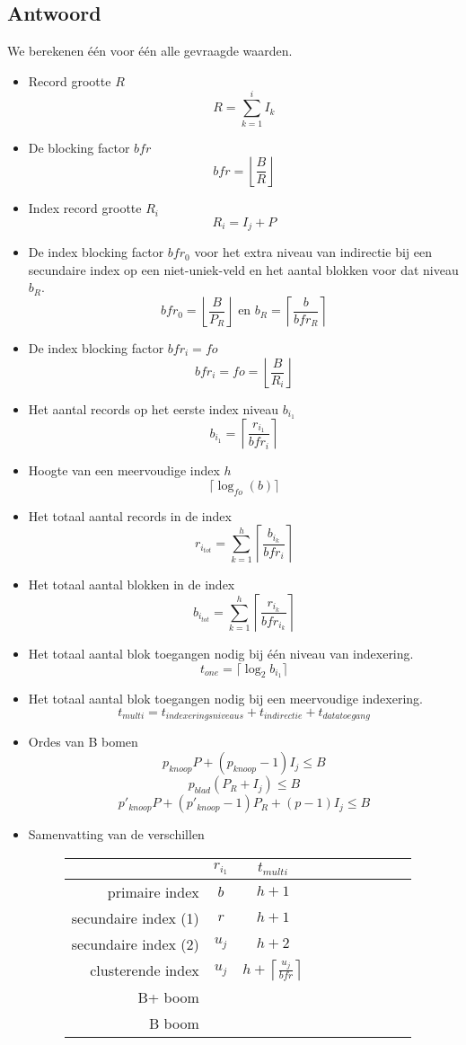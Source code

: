 \documentclass[indexstructuren.tex]{subfiles}
\begin{document}
\begin{itemize}
\begin{itemize}
\end{itemize}
\end{itemize}
\subsection*{Antwoord}
We berekenen  \'e\'en voor \'e\'en alle gevraagde waarden.
\begin{itemize}
\item Record grootte $R$
\[
R = \sum_{k=1}^{i}I_k
\]
\item De blocking factor $bfr$
\[
bfr = \left\lfloor \frac{B}{R} \right\rfloor
\]
\item Index record grootte $R_i$
\[
R_{i} = I_{j} + P
\]
\item De index blocking factor $bfr_0$ voor het extra niveau van indirectie bij een secundaire index op een niet-uniek-veld en het aantal blokken voor dat niveau $b_{R}$.
\[
bfr_0 = \left\lfloor \frac{B}{P_R} \right\rfloor \text{ en } b_{R} = \left\lceil \frac{b}{bfr_R} \right\rceil 
\]
\item De index blocking factor $bfr_i = fo$
\[
bfr_i = fo = \left\lfloor \frac{B}{R_i} \right\rfloor
\]
\item Het aantal records op het eerste index niveau $b_{i_{1}}$
\[
b_{i_{1}} = \left\lceil \frac{r_{i_{1}}}{bfr_i}\right\rceil
\]
\item Hoogte van een meervoudige index $h$
\[
\lceil \log_{fo}(b) \rceil
\]
\item Het totaal aantal records in de index
\[
r_{i_{tot}} = \sum_{k=1}^{h}\left\lceil\frac{b_{i_k}}{bfr_i}\right\rceil
\]
\item Het totaal aantal blokken in de index
\[
b_{i_{tot}} = \sum_{k=1}^h\left\lceil \frac{r_{i_{k}}}{bfr_{i_k}} \right\rceil
\]
\item Het totaal aantal blok toegangen nodig bij \'e\'en niveau van indexering.
\[
t_{one} = \lceil \log_{2}b_{i_{1}} \rceil
\]
\item Het totaal aantal blok toegangen nodig bij een meervoudige indexering.
\[
t_{multi} = t_{indexeringsniveaus} + t_{indirectie} + t_{datatoegang}
\]
\item Ordes van B bomen
\[
p_{knoop} P + (p_{knoop} - 1)I_{j} \le B
\]
\[
p_{blad}(P_{R} + I_{j}) \le B
\]
\[
p'_{knoop} P + (p'_{knoop}-1)P_{R} + (p-1)I_{j} \le B
\]
\item Samenvatting van de verschillen
\begin{figure}[H]
\centering
\begin{tabular}{r|ccccccccc}
& $r_{i_{1}}$ & $t_{multi}$\\
\hline
primaire index & $b$ & $h+1$\\
secundaire index (1) & $r$ & $h+1$\\
secundaire index (2) & $u_j$ & $h+2$\\
clusterende index & $u_j$ & $h+\left\lceil\frac{u_j}{bfr}\right\rceil$\\
B+ boom & \\
B boom & \\
\end{tabular}
\end{figure}
\end{itemize}
\end{document}

